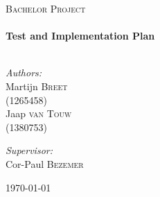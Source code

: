 \begin{titlepage}

\begin{center}



\textsc{\LARGE Bachelor Project }\\[1.5cm]


\HRule \\[0.4cm]
{ \huge \bfseries Test and Implementation Plan}\\[0.4cm]

\HRule \\[1.5cm]

\begin{minipage}{0.4\textwidth}
\begin{flushleft} \large
\emph{Authors:}\\
Martijn \textsc{Breet} \\ (1265458) \\ [0.1cm]
Jaap \textsc{van Touw} \\(1380753)\\ [0.1cm]
\end{flushleft}
\end{minipage}
\begin{minipage}{0.4\textwidth}
\begin{flushright} \large
\emph{Supervisor:} \\
Cor-Paul \textsc{Bezemer}
\end{flushright}
\end{minipage}

\vfill

{\large \today}

\end{center}

\end{titlepage}
